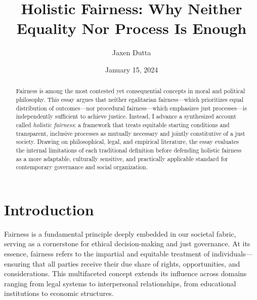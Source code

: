 \documentclass[11pt,showkeys]{../../shared/essay}
\begin{document}
\title[Holistic Fairness: Why Neither Equality Nor Process Is Enough]{\texorpdfstring{Holistic Fairness:\newline
Why Neither Equality Nor Process Is Enough}{Holistic Fairness: Why Neither Equality Nor Process Is Enough}}

\author{Jaxen Dutta}

\date{January 15, 2024}

\begin{abstract}
Fairness is among the most contested yet consequential concepts in moral and political
philosophy. This essay argues that neither egalitarian fairness---which prioritizes equal
distribution of outcomes---nor procedural fairness---which emphasizes just processes---is
independently sufficient to achieve justice. Instead, I advance a synthesized account called
\textit{holistic fairness}: a framework that treats equitable starting conditions and transparent,
inclusive processes as mutually necessary and jointly constitutive of a just society. Drawing on
philosophical, legal, and empirical literature, the essay evaluates the internal limitations of each
traditional definition before defending holistic fairness as a more adaptable, culturally sensitive,
and practically applicable standard for contemporary governance and social organization.
\end{abstract}


\maketitle

\section{Introduction}

Fairness is a fundamental principle deeply embedded in our societal fabric, serving as a
cornerstone for ethical decision-making and just governance. At its essence, fairness refers to
the impartial and equitable treatment of individuals---ensuring that all parties receive their due
share of rights, opportunities, and considerations. This multifaceted concept extends its
influence across domains ranging from legal systems to interpersonal relationships, from
educational institutions to economic structures.
\end{document}
